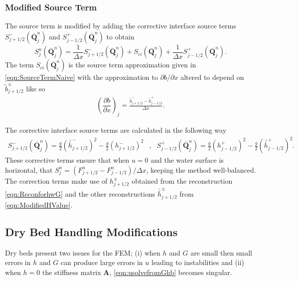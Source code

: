 \documentclass[times]{elsarticle}
\newcommand{\matr}[1]{\mathbf{#1}}
\newcommand{\vecn}[1]{\boldsymbol{#1}}
\begin{document}
\subsubsection{Modified Source Term}
The source term is modified by adding the corrective interface source terms $S^{-}_{j + 1/2}\left(\overline{\vecn{Q} }^{n}_j \right)$ and $S^{+}_{j - 1/2}\left(\overline{\vecn{Q} }^{n}_j \right)$ to obtain
\begin{equation*}
S^n_j\left(\overline{\vecn{Q} }^{n}_j \right)  =  \frac{1}{\Delta x}S^{-}_{j + 1/2}\left(\overline{\vecn{Q} }^{n}_j \right)  +  S_{ci}\left(\overline{\vecn{Q} }^{n}_j \right)  +  \frac{1}{\Delta x}S^{+}_{j - 1/2}\left(\overline{\vecn{Q} }^{n}_j \right) .
\end{equation*}
The term $S_{ci}\left(\overline{\vecn{Q} }^{n}_j \right) $ is the source term approximation given in \eqref{eqn:SourceTermNaive} with the approximation to $\partial b / \partial x$ altered to depend on $\tilde{b}^\pm_{j+1/2}$ like so
\begin{align*}
\left(\dfrac{\partial {b}}{\partial x} \right)_{j} =  \frac{\tilde{b}^-_{j+1/2} - \tilde{b}^+_{j-1/2}}{\Delta x}.
\end{align*}

The corrective interface source terms are calculated in the following way
\begin{align*}
S^{-}_{j + 1/2}\left(\overline{\vecn{Q} }^{n}_j \right)  =  \frac{g}{2} \left(\bar{\bar{h}}^{-}_{j + 1/2} \right)^2 - \frac{g}{2} \left(h^{-}_{j + 1/2} \right)^2&,&
S^{+}_{j - 1/2}\left(\overline{\vecn{Q} }^{n}_j \right)  =  \frac{g}{2} \left(h^{+}_{j - 1/2}\right)^2 - \frac{g}{2}\left(\bar{\bar{h}}^{+}_{j - 1/2}\right)^2 .
\end{align*}
These corrective terms ensure that when $u=0$ and the water surface is horizontal, that $S^n_j = \left(F^n_{j+1/2} - F^n_{j-1/2} \right) / \Delta x$, keeping the method well-balanced. The correction terms make use of $h^{\pm}_{j + 1/2}$ obtained from the reconstruction \eqref{eqn:ReconforhwG} and the other reconstructions $\bar{\bar{h}}^{\pm}_{j + 1/2}$ from \eqref{eqn:ModifiedHValue}. 

\subsection{Dry Bed Handling Modifications}
Dry beds present two issues for the FEM; (i) when $h$ and $G$ are small then small errors in $h$ and $G$ can produce large errors in $u$ leading to instabilities and  (ii) when $h=0$ the stiffness matrix $\matr{A}$, \eqref{eqn:usolvefromGhb} becomes singular.
\end{document}
